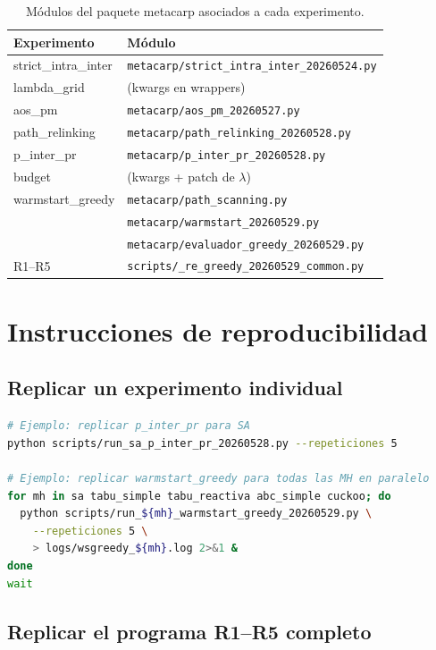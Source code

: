 \documentclass[11pt,a4paper]{article}
\theoremstyle{definition}
\theoremstyle{remark}
\begin{document}
\begin{table}[h]
\centering
\caption{Módulos del paquete metacarp asociados a cada experimento.}
\small
\begin{tabular}{ll}
\toprule
Experimento & Módulo \\
\midrule
strict\_intra\_inter & \texttt{metacarp/strict\_intra\_inter\_20260524.py} \\
lambda\_grid & (kwargs en wrappers) \\
aos\_pm & \texttt{metacarp/aos\_pm\_20260527.py} \\
path\_relinking & \texttt{metacarp/path\_relinking\_20260528.py} \\
p\_inter\_pr & \texttt{metacarp/p\_inter\_pr\_20260528.py} \\
budget & (kwargs + patch de $\lambda$) \\
warmstart\_greedy & \texttt{metacarp/path\_scanning.py} \\
                  & \texttt{metacarp/warmstart\_20260529.py} \\
                  & \texttt{metacarp/evaluador\_greedy\_20260529.py} \\
R1--R5 & \texttt{scripts/\_re\_greedy\_20260529\_common.py} \\
\bottomrule
\end{tabular}
\end{table}

\section{Instrucciones de reproducibilidad}

\subsection{Replicar un experimento individual}

\begin{lstlisting}[language=bash]
# Ejemplo: replicar p_inter_pr para SA
python scripts/run_sa_p_inter_pr_20260528.py --repeticiones 5

# Ejemplo: replicar warmstart_greedy para todas las MH en paralelo
for mh in sa tabu_simple tabu_reactiva abc_simple cuckoo; do
  python scripts/run_${mh}_warmstart_greedy_20260529.py \
    --repeticiones 5 \
    > logs/wsgreedy_${mh}.log 2>&1 &
done
wait
\end{lstlisting}

\subsection{Replicar el programa R1--R5 completo}
\end{document}
